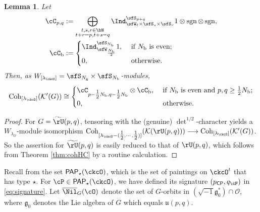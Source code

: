 \documentclass[12pt,a4paper]{amsart}
\def\Im{\operatorname{Im}}
\newcommand{\CK}{{\mathcal {K}}}
\newcommand{\CO}{{\mathcal {O}}}
\newcommand{\CP}{{\mathcal {P}}}
\newcommand{\sgn}{\operatorname{sgn}}
\newcommand{\g}{\mathfrak g}
\renewcommand{\u}{\mathfrak u}
\renewcommand{\t}{\mathfrak t}
\numberwithin{equation}{section}
\newtheorem{lem}[thm]{Lemma}
\theoremstyle{remark}
\def\half{{\tfrac{1}{2}}}
\def\CP{\mathsf{CP}}
\def\lamck{\lambda_\ckcO}
\def\Lamck{[\lambda_\ckcO]}
\def\PP{\mathsf{PAP}}
\def\WLamck{W_{[\lambda_{\ckcO}]}}
\def\tU{\widetilde{\rU}}
\def\Im{\mathrm{Im}}
\def\Coh{\mathrm{Coh}}
\begin{document}

\begin{lem}\label{lem:ccrU}
  Let
\[
  \begin{split}
    \cC_{p,q} &:= \bigoplus_{\substack{t,s,r\in \bN\\t+r=p, t+s = q}}
    \Ind_{\sfW_{t}\times \sfS_s\times \sfS_r}^{\sfS_{p+q}}
 1\otimes \sgn \otimes \sgn ,\\
 \cC_{\mathrm b} &:= \begin{cases}
  \Ind_{\sfW_{\frac{N_{\mathrm b}}{2}}}^{\sfS_{N_{\mathrm b}}} 1, & \ \text{if $N_{\mathrm b}$ is even};\\
  0, & \ \text{otherwise}.
 \end{cases}
  \end{split}
\]
Then, as $\WLamck =\sfS_{N_{\mathrm g}}\times \sfS_{N_{\mathrm b}}$-modules,
\[
  \Coh_{\Lamck}(\CK'(G)) \cong \begin{cases}
    \cC_{p-\half N_{\mathrm b},q-\half N_{\mathrm b}}\otimes \cC_{\mathrm b}, &\  \text{if $N_{\mathrm b}$ is even and
      $p,q \geq \half N_{\mathrm b}$};\\
    0, & \ \text{otherwise}.
  \end{cases}
\]
\end{lem}
\begin{proof}
  For $G=\tU(p,q)$, tensoring with the (genuine) $\det^{1/2}$-character yields a
  $W_{\lambda_{\check \CO}}$-module isomorphism
  $\Coh_{[\lamck-(\half, \cdots, \half)]}(\CK(\rU(p,q))) \longrightarrow \Coh_{\Lamck}(\CK'(G))$.
  So the assertion for $\tU(p,q)$ is easily reduced to that of $\rU(p,q)$, which follows from Theorem \ref{thm:cohHC} by a routine
  calculation.
\end{proof}


Recall from  the set $\PP_{\star}(\ckcO)$, which is the set of paintings on $\ckcO^{t}$ that has type $\star$.
For $\cP \in \PP_{\star}(\ckcO)$, we have defined its signature $(p_\CP, q_\cP)$ in \eqref{eq:signature}. Let $\overline \Nil_{G}(\cO)$ denote the set of $G$-orbits in $(\sqrt{-1}\g_0^*)\cap \CO$, where $\g_0$ denotes the Lie algebra of $G$ which equals $\u(p,q)$.  
\end{document}
